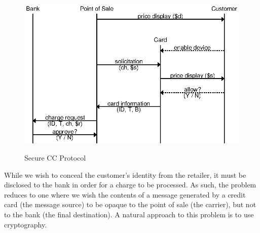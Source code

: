 \begin{figure}[h!]
  \caption{Secure CC Protocol}
  \centering
    \includegraphics{img/secure_ccp.eps}
  \label{fig:secure_ccp_recall}
\end{figure}


While we wish to conceal the customer's identity from the retailer, it must be disclosed to the bank in order for a charge to be processed.
As such, the problem reduces to one where we wish the contents of a message generated by a credit card (the message source)
  to be opaque to the point of sale (the carrier), but not to the bank (the final destination).
A natural approach to this problem is to use cryptography.
